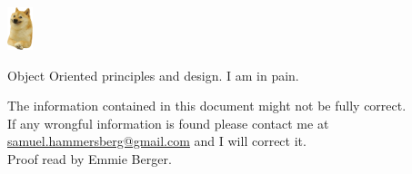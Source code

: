 \documentclass{article}
\begin{document}
\includegraphics[width=2em]{2ljhyisqtna51.png}
\begin{center}
    \vspace*{\fill}
    {\Huge Object Oriented principles and design.}\newline
    {\small I am in pain.}
    \vspace*{\fill}
    \mbox{}
    \vfill
    \begin{flushright}
        The information contained in this document might not be fully correct.\\
        If any wrongful information is found please contact me at\\
        \underline{samuel.hammersberg@gmail.com} and I will correct it.\\
        Proof read by Emmie Berger.
    \end{flushright}
\end{center}
\newpage
\end{document}
